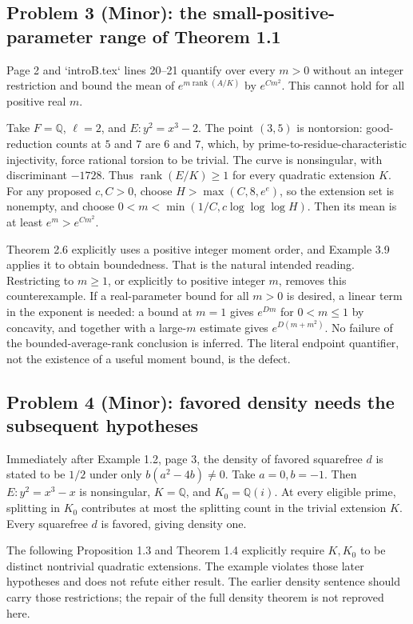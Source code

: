 \documentclass[10pt]{article}
\begin{document}
\subsection*{Problem 3 (Minor): the small-positive-parameter range of Theorem 1.1}
Page 2 and `introB.tex` lines 20–21 quantify over every \(m>0\) without an integer restriction and bound the mean of \(e^{m\operatorname{rank}(A/K)}\) by \(e^{Cm^2}\). This cannot hold for all positive real \(m\).\par
Take \(F=\mathbb Q\), \(\ell=2\), and \(E:y^2=x^3-2\). The point \((3,5)\) is nontorsion: good-reduction counts at \(5\) and \(7\) are \(6\) and \(7\), which, by prime-to-residue-characteristic injectivity, force rational torsion to be trivial. The curve is nonsingular, with discriminant \(-1728\). Thus \(\operatorname{rank}(E/K)\ge1\) for every quadratic extension \(K\). For any proposed \(c,C>0\), choose \(H>\max(C,8,e^e)\), so the extension set is nonempty, and choose \(0<m<\min(1/C,c\log\log\log H)\). Then its mean is at least \(e^m>e^{Cm^2}\).\par
Theorem 2.6 explicitly uses a positive integer moment order, and Example 3.9 applies it to obtain boundedness. That is the natural intended reading. Restricting to \(m\ge1\), or explicitly to positive integer \(m\), removes this counterexample. If a real-parameter bound for all \(m>0\) is desired, a linear term in the exponent is needed: a bound at \(m=1\) gives \(e^{Dm}\) for \(0<m\le1\) by concavity, and together with a large-\(m\) estimate gives \(e^{D(m+m^2)}\). No failure of the bounded-average-rank conclusion is inferred. The literal endpoint quantifier, not the existence of a useful moment bound, is the defect.\par
\subsection*{Problem 4 (Minor): favored density needs the subsequent hypotheses}
Immediately after Example 1.2, page 3, the density of favored squarefree \(d\) is stated to be \(1/2\) under only \(b(a^2-4b)\ne0\). Take \(a=0,b=-1\). Then \(E:y^2=x^3-x\) is nonsingular, \(K=\mathbb Q\), and \(K_0=\mathbb Q(i)\). At every eligible prime, splitting in \(K_0\) contributes at most the splitting count in the trivial extension \(K\). Every squarefree \(d\) is favored, giving density one.\par
The following Proposition 1.3 and Theorem 1.4 explicitly require \(K,K_0\) to be distinct nontrivial quadratic extensions. The example violates those later hypotheses and does not refute either result. The earlier density sentence should carry those restrictions; the repair of the full density theorem is not reproved here.\par
\end{document}
